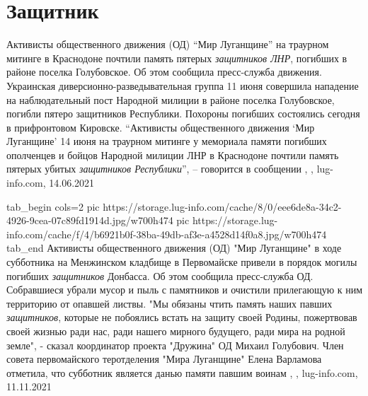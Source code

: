  
 
 
 
 
\chapter{Защитник}
\label{sec:slova.zaschitnik}

Активисты общественного движения (ОД) \enquote{Мир Луганщине} на траурном
митинге в Краснодоне почтили память пятерых \emph{защитников ЛНР}, погибших в
районе поселка Голубовское. Об этом сообщила пресс-служба движения.  Украинская
диверсионно-разведывательная группа 11 июня совершила нападение на
наблюдательный пост Народной милиции в районе поселка Голубовское, погибли
пятеро защитников Республики. Похороны погибших состоялись сегодня в
прифронтовом Кировске.  \enquote{Активисты общественного движения \enquote{Мир
Луганщине} 14 июня на траурном митинге у мемориала памяти погибших ополченцев и
бойцов Народной милиции ЛНР в Краснодоне почтили память пятерых убитых
\emph{защитников Республики}}, – говорится в сообщении
, , lug-info.com,
14.06.2021

\ifcmt
  tab_begin cols=2
     pic https://storage.lug-info.com/cache/8/0/eee6de8a-34c2-4926-9cea-07c89fd1914d.jpg/w700h474
     pic https://storage.lug-info.com/cache/f/4/b6921b0f-38ba-49db-af3e-a4528d14f0a8.jpg/w700h474
  tab_end
\fi
Активисты общественного движения (ОД) "Мир Луганщине" в ходе субботника на
Менжинском кладбище в Первомайске привели в порядок могилы погибших \emph{защитников}
Донбасса. Об этом сообщила пресс-служба ОД.  Собравшиеся убрали мусор и пыль с
памятников и очистили прилегающую к ним территорию от опавшей листвы.  "Мы
обязаны чтить память наших павших \emph{защитников}, которые не побоялись встать на
защиту своей Родины, пожертвовав своей жизнью ради нас, ради нашего мирного
будущего, ради мира на родной земле", - сказал координатор проекта "Дружина" ОД
Михаил Голубович.  Член совета первомайского теротделения "Мира Луганщине"
Елена Варламова отметила, что субботник является данью памяти павшим воинам
, 
, lug-info.com, 11.11.2021

